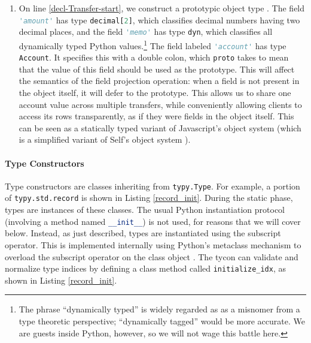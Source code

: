 \documentclass[preprint,10pt]{sigplanconf}
\newcommand{\lip}[1]{\lstinline[language=Python,basicstyle=\ttfamily\small,deletendkeywords={tuple,buffer,map}]{#1}}
\begin{document}
\begin{enumerate}
\item On line \ref{decl-Transfer-start}, we construct a prototypic object type \cite{Lie86}. The field \lip{'amount'} has type \lip{decimal[2]}, which classifies decimal numbers having two decimal places, and the field \lip{'memo'} has type \lip{dyn}, which classifies all dynamically typed Python values.\footnote{The phrase ``dynamically typed'' is widely regarded as as a misnomer from a type theoretic perspective; ``dynamically tagged'' would be more accurate. We are guests inside Python, however, so we will not wage this battle here.} The field labeled \lip{'account'} has type \lip{Account}. It specifies this with a double colon, which \lip{proto} takes to mean that the value of this field should be used as the prototype. This will affect the semantics of the field projection operation: when a field is not present in the object itself, it will defer to the prototype. This allows us to  share one account value across multiple transfers, while conveniently allowing clients to access its rows transparently, as if they were fields in the object itself. This can be seen as a statically typed variant of Javascript's object system (which is a simplified variant of Self's object system \cite{Ungar:Smith:oopsla:1987}). %
\end{enumerate}



\paragraph{Type Constructors} Type constructors are classes inheriting from \lip{typy.Type}. For example, a portion of \lip{typy.std.record} is shown in Listing \ref{record_init}. During the static phase, types are instances of these classes. The usual Python instantiation protocol (involving a method named \lip{__init__}) is not used, for reasons that we will cover below. Instead, as just described, types are instantiated using the subscript operator. This is implemented internally using Python's metaclass mechanism to overload the subscript operator on the class object \cite{python}. The tycon can validate and normalize  type indices by defining a class method called \lip{initialize_idx}, as shown in Listing \ref{record_init}. %
\end{document}
